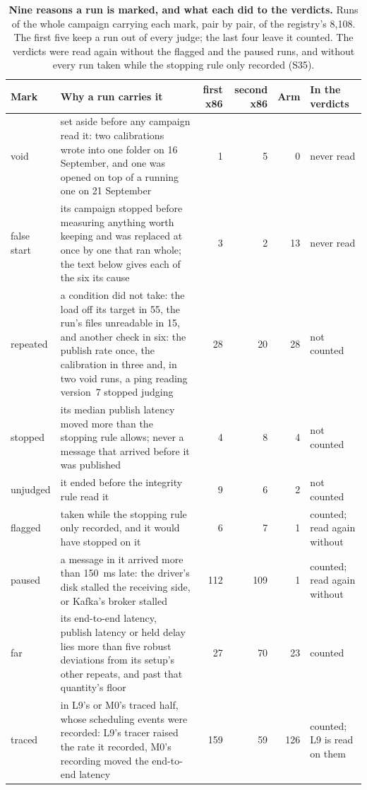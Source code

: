 \documentclass[10pt,journal,onecolumn]{IEEEtran}
\newcommand{\kafka}{Kafka}
\begin{document}
\begin{table}[htbp]
\caption{\textbf{Nine reasons a run is marked, and what each did to the verdicts.} Runs of the whole
campaign carrying each mark, pair by pair, of the registry's 8,108. The first five keep a run out
of every judge; the last four leave it counted. The verdicts were read again without the flagged
and the paused runs, and without every run taken while the stopping rule only recorded (S35).}
\label{tab:lawmarks}
\centering
\footnotesize
\begin{tabular}{@{}p{1.7cm}p{8.6cm}rrrp{2.9cm}@{}}
\toprule
Mark & Why a run carries it & first x86 & second x86 & Arm & In the verdicts\tabularnewline
\midrule
void & \raggedright set aside before any campaign read it: two calibrations wrote into one folder
on 16 September, and one was opened on top of a running one on 21 September & 1 & 5 & 0 &
\raggedright never read\tabularnewline
false start & \raggedright its campaign stopped before measuring anything worth keeping and was
replaced at once by one that ran whole; the text below gives each of the six its cause & 3 & 2 &
13 &
\raggedright never read\tabularnewline
repeated & \raggedright a condition did not take: the load off its target in 55, the run's files
unreadable in 15, and another check in six: the publish rate once, the calibration in three and, in
two void runs, a ping reading version~7 stopped judging & 28 & 20 & 28 & \raggedright not
counted\tabularnewline
stopped & \raggedright its median publish latency moved more than the stopping rule allows; never a message that
arrived before it was published & 4 & 8 & 4 & \raggedright not counted\tabularnewline
unjudged & \raggedright it ended before the integrity rule read it & 9 & 6 & 2 & \raggedright not
counted\tabularnewline
flagged & \raggedright taken while the stopping rule only recorded, and it would have stopped on
it & 6 & 7 & 1 & \raggedright counted; read again without\tabularnewline
paused & \raggedright a message in it arrived more than 150~ms late: the driver's disk stalled the
receiving side, or \kafka{}'s broker stalled & 112 & 109 & 1 & \raggedright counted; read again
without\tabularnewline
far & \raggedright its end-to-end latency, publish latency or held delay lies more than five robust deviations from
its setup's other repeats, and past that quantity's floor & 27 & 70 & 23 & \raggedright
counted\tabularnewline
traced & \raggedright in L9's or M0's traced half, whose scheduling events were recorded: L9's
tracer raised the rate it recorded, M0's recording moved the end-to-end latency & 159 & 59 & 126 &
\raggedright counted; L9 is read on them\tabularnewline
\bottomrule
\end{tabular}
\end{table}
\end{document}
